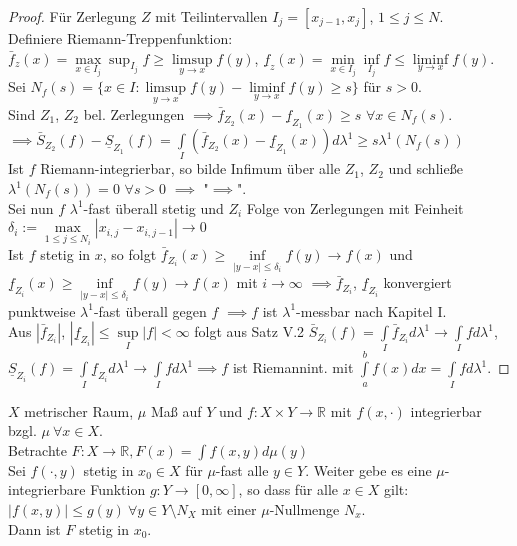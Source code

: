   \begin{proof}
    Für Zerlegung $Z$ mit Teilintervallen $I_j = [x_{j-1},x_j]$, $1\leq j \leq N$.\\ Definiere Riemann-Treppenfunktion: \\ $\bar{f}_z(x) = \max\limits_{x\in I_j}\sup_{I_j} f \geq \limsup\limits_{y\to x} f(y)$, $\underline{f}_z(x) = \min\limits_{x\in I_j}\inf\limits_{I_j} f \leq \liminf\limits_{y\to x} f(y)$.  \\
    Sei $N_f(s) = \{ x\in I: \limsup\limits_{y\to x}f(y) - \liminf\limits_{y\to x}f(y) \geq s \}$ für $s > 0$. \\
    Sind $Z_1$, $Z_2$ bel. Zerlegungen $\implies \bar{f}_{Z_2}(x) - \underline{f}_{Z_1}(x) \geq s$ $\forall x\in N_f(s)$. \\
    $\implies \bar{S}_{Z_2}(f) - \underline{S}_{Z_1}(f) = \int\limits_{I} (\bar{f}_{Z_2}(x)-\underline{f}_{Z_1}(x)) d\lambda^1 \geq s \lambda^1 (N_f(s))$ \\
    Ist $f$ Riemann-integrierbar, so bilde Infimum über alle $Z_1$, $Z_2$ und schließe $\lambda^1 (N_f(s))=0$ $\forall s>0$ $\implies$ "$\implies$". \\
    Sei nun $f$ $\lambda^1$-fast überall stetig und $Z_i$ Folge von Zerlegungen mit Feinheit \\ $\delta_i := \max\limits_{1\leq j \leq N_i} |x_{i,j}-x_{i,j-1}| \to 0$ \\
    Ist $f$ stetig in $x$, so folgt $\bar{f}_{Z_i} (x) \geq \inf\limits_{|y-x| \leq \delta_i } f(y) \to f(x)$ und $\underline{f}_{Z_i} (x) \geq \inf\limits_{|y-x| \leq \delta_i } f(y) \to f(x)$ mit $i\to\infty$ $\implies \bar{f}_{Z_i}$, $\underline{f}_{Z_i}$ konvergiert punktweise $\lambda^1$-fast überall gegen $f$ $\implies f$ ist $\lambda^1$-messbar nach Kapitel I. \\
    Aus $|\bar{f}_{Z_i}|$, $|\underline{f}_{Z_i}| \leq \sup\limits_{I} |f| < \infty$ folgt aus Satz V.2 $\bar{S}_{Z_i}(f) = \int\limits_{I} \bar{f}_{Z_i} d\lambda^1 \to \int\limits_{I} f d\lambda^1$, \\
    $\underline{S}_{Z_i}(f) = \int\limits_{I} \underline{f}_{Z_i} d\lambda^1 \to \int\limits_{I} f d\lambda^1 \implies f$ ist Riemannint. mit $\int\limits_{a}^b f(x) dx = \int\limits_{I} f d\lambda^1$.
  \end{proof}

  \begin{theorem}
    $X$ metrischer Raum, $\mu$ Maß auf $Y$ und $f:X \times Y \to \mathbb{R}$ mit $f(x, \cdot)$ integrierbar bzgl. $\mu \ \forall x \in X$.\\
    Betrachte $F: X \to \mathbb{R}, F(x) = \int f(x,y) d\mu(y)$\\
    Sei $f(\cdot, y)$ stetig in $x_0 \in X$ für $\mu$-fast alle $y \in Y$. Weiter gebe es eine $\mu$-integrierbare Funktion $g: Y \to [0, \infty]$, so dass für alle $x \in X$ gilt: $|f(x,y)| \leq g(y) \ \forall y \in Y \setminus N_X$ mit einer $\mu$-Nullmenge $N_x$.\\
    Dann ist $F$ stetig in $x_0$.
  \end{theorem}

